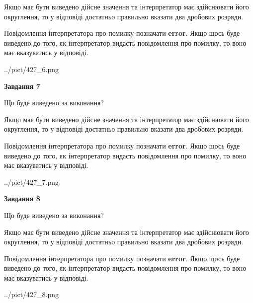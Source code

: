 \documentclass[12pt, ukrainian]{article}
\begin{document}
{\begin {Large}
Якщо має бути виведено дійсне значення та інтерпретатор має здійснювати його округлення, 
то у відповіді достатньо правильно вказати два дробових розряди.

Повідомлення інтерпретатора про помилку позначати \textbf{error}.
Якщо щось буде виведено до того, як інтерпретатор видасть повідомлення про помилку, 
то воно має вказуватись у відповіді. \par

\begin{center}
	{../pict/427_6.png}
\end{center}
\newpage

{\begin {center}\textbf{Завдання 7}\end {center}}\par
Що буде виведено за виконання? \par

Якщо має бути виведено дійсне значення та інтерпретатор має здійснювати його округлення, 
то у відповіді достатньо правильно вказати два дробових розряди.

Повідомлення інтерпретатора про помилку позначати \textbf{error}.
Якщо щось буде виведено до того, як інтерпретатор видасть повідомлення про помилку, 
то воно має вказуватись у відповіді. \par

\begin{center}
	{../pict/427_7.png}
\end{center}
\newpage

{\begin {center}\textbf{Завдання 8}\end {center}}\par
Що буде виведено за виконання? \par

Якщо має бути виведено дійсне значення та інтерпретатор має здійснювати його округлення, 
то у відповіді достатньо правильно вказати два дробових розряди.

Повідомлення інтерпретатора про помилку позначати \textbf{error}.
Якщо щось буде виведено до того, як інтерпретатор видасть повідомлення про помилку, 
то воно має вказуватись у відповіді. \par

\begin{center}
	{../pict/427_8.png}
\end{center}
\newpage


\end{Large}}
\end{document}
